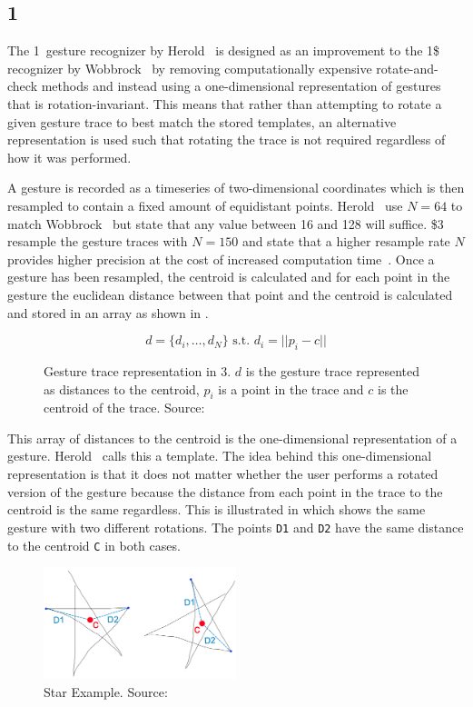 \subsection{1\textcent}

The 1\textcent~gesture recognizer by Herold \etal~is designed as an improvement to the 1\$ recognizer \cite{wobbrock2007gestures} by Wobbrock \etal~by removing computationally expensive rotate-and-check methods and instead using a one-dimensional representation of gestures that is rotation-invariant.
This means that rather than attempting to rotate a given gesture trace to best match the stored templates, an alternative representation is used such that rotating the trace is not required regardless of how it was performed.

A gesture is recorded as a timeseries of two-dimensional coordinates which is then resampled to contain a fixed amount of equidistant points.
Herold \etal~use $N = 64$ to match Wobbrock \etal~but state that any value between 16 and 128 will suffice.
\$3 resample the gesture traces with $N = 150$ and state that a higher resample rate $N$ provides higher precision at the cost of increased computation time~\cite[p. 342]{threedollar}.
Once a gesture has been resampled, the centroid is calculated and for each point in the gesture the euclidean distance between that point and the centroid is calculated and stored in an array as shown in .

\begin{figure}[h]
\[ d = \{d_i,\ldots,d_N\} \text{ s.t. } d_i=||p_i-c|| \]
\caption{Gesture trace representation in 3\textcent. $d$ is the gesture trace represented as distances to the centroid, $p_i$ is a point in the trace and $c$ is the centroid of the trace. Source:~\cite{herold20121}}
\label{eq:one-cent-trace}
\end{figure}

This array of distances to the centroid is the one-dimensional representation of a gesture. Herold \etal~calls this a template.
The idea behind this one-dimensional representation is that it does not matter whether the user performs a rotated version of the gesture because the distance from each point in the trace to the centroid is the same regardless.
This is illustrated in  which shows the same gesture with two different rotations.
The points \texttt{D1} and \texttt{D2} have the same distance to the centroid \texttt{C} in both cases.

\begin{figure}[h]
\centering
\includegraphics[width=0.5\textwidth]{images/one-cent-star-example}
\caption{Star Example. Source:~\cite{herold20121}}
\label{fig:one-cent-star}
\end{figure}

